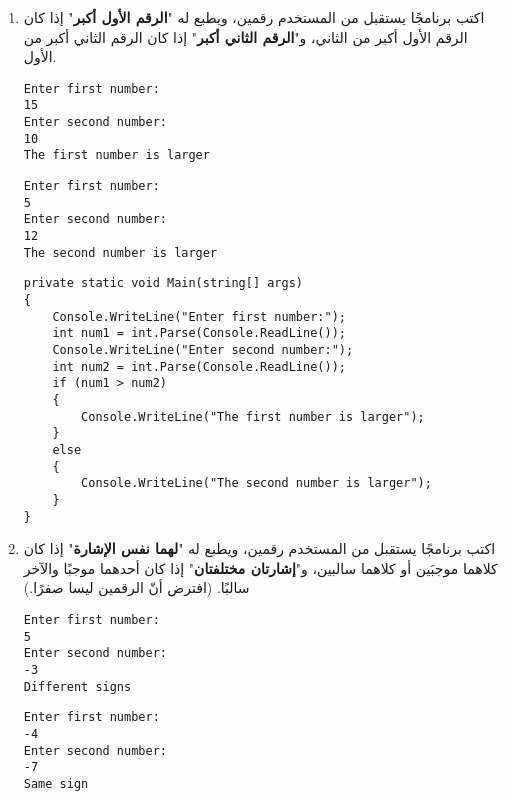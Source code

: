 \documentclass[12pt, twoside]{article}
\begin{document}
\begin{enumerate}[itemsep=3em]
\begin{enumerate}
\item
اكتب برنامجًا يستقبل من المستخدم رقمين، ويطبع له "\textbf{الرقم الأول أكبر}" إذا كان الرقم الأول أكبر من الثاني، و"\textbf{الرقم الثاني أكبر}" إذا كان الرقم الثاني أكبر من الأول.
\ifdetailed
\begin{boxExample}[1]
\begin{english}
\begin{verbatim}
Enter first number:
15
Enter second number:
10
The first number is larger
\end{verbatim}
\end{english}
\end{boxExample}
\begin{boxExample}[2]
\begin{english}
\begin{verbatim}
Enter first number:
5
Enter second number:
12
The second number is larger
\end{verbatim}
\end{english}
\end{boxExample}

\ifwithsols
\begin{boxSolution}
\begin{english}
\begin{verbatim}
private static void Main(string[] args)
{
    Console.WriteLine("Enter first number:");
    int num1 = int.Parse(Console.ReadLine());
    Console.WriteLine("Enter second number:");
    int num2 = int.Parse(Console.ReadLine());
    if (num1 > num2)
    {
        Console.WriteLine("The first number is larger");
    }
    else
    {
        Console.WriteLine("The second number is larger");
    }
}
\end{verbatim}
\end{english}
\end{boxSolution}
\clearpage
\fi
\fi

\item
اكتب برنامجًا يستقبل من المستخدم رقمين، ويطبع له "\textbf{لهما نفس الإشارة}" إذا كان كلاهما موجبَين أو كلاهما سالبين، و"\textbf{إشارتان مختلفتان}" إذا كان أحدهما موجبًا والآخر سالبًا.
(افترض أنّ الرقمين ليسا صفرًا.)
\ifdetailed
\begin{boxExample}[1]
\begin{english}
\begin{verbatim}
Enter first number:
5
Enter second number:
-3
Different signs
\end{verbatim}
\end{english}
\end{boxExample}
\begin{boxExample}[2]
\begin{english}
\begin{verbatim}
Enter first number:
-4
Enter second number:
-7
Same sign
\end{verbatim}
\end{english}
\end{boxExample}


\end{enumerate}
\end{enumerate}
\end{document}
